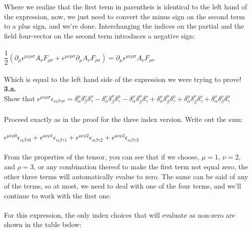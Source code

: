 \documentclass[prb,preprint]
{revtex4-1}
\newcommand{\PRLsep}{\noindent\makebox[\linewidth]{\resizebox{0.8888\linewidth}{2pt}{$\bullet$}}\bigskip}
\begin{document}
\\
\\
Where we realize that the first term in parentheis is identical to the left hand of the expression, now, we just need to convert the minus sign on the second term to a plus sign, and we're done.  Interchanging the indices on the partial and the field four-vector on the second term introduces a negative sign:
\\
\\
$\dfrac{1}{2} \left(\partial_\mu \epsilon^{\mu\nu\rho\sigma}  A_\nu F_{\rho\sigma} + \epsilon^{\mu\nu\rho\sigma} \partial_\mu A_\nu F_{\rho\sigma}\right) = \partial_\mu \epsilon^{\mu\nu\rho\sigma}A_\nu F_{\rho\sigma}$
\\
\\
Which is equal to the left hand side of the expression we were trying to prove!
\\
\PRLsep
\newpage
\textbf{3.a.}
\\
Show that $\epsilon^{\mu\nu\rho\sigma}\epsilon_{\alpha\beta\gamma\sigma} = \delta^\mu_\alpha \delta^\nu_\beta \delta^\rho_\gamma - \delta^\nu_\alpha \delta^\rho_\beta \delta^\mu_\gamma - \delta^\rho_\alpha \delta^\mu_\beta \delta^\nu_\gamma + \delta^\nu_\alpha \delta^\mu_\beta \delta^\rho_\gamma + \delta^\mu_\alpha \delta^\rho_\beta \delta^\nu_\gamma + \delta^\rho_\alpha \delta^\nu_\beta \delta^\mu_\gamma$ 
\\
\\
Proceed exactly as in the proof for the three index version.  Write out the sum:
\\
\\
$\epsilon^{\mu\nu\rho 0}\epsilon_{\alpha\beta\gamma 0} + \epsilon^{\mu\nu\rho 1}\epsilon_{\alpha\beta\gamma 1} + \epsilon^{\mu\nu\rho 2}\epsilon_{\alpha\beta\gamma 2} + \epsilon^{\mu\nu\rho 3}\epsilon_{\alpha\beta\gamma 3}$
\\
\\
From the properties of the tensor, you can see that if we choose, $\mu = 1$, $\nu = 2$, and $\rho = 3$, or any combination thereof to make the first term not equal zero, the other three terms will automatically evalue to zero. The same can be said of any of the terms, so at most, we need to deal with one of the four terms, and we'll continue to work with the first one.
\\
\\
For this expression, the only index choices that will evaluate as non-zero are shown in the table below:
\end{document}
